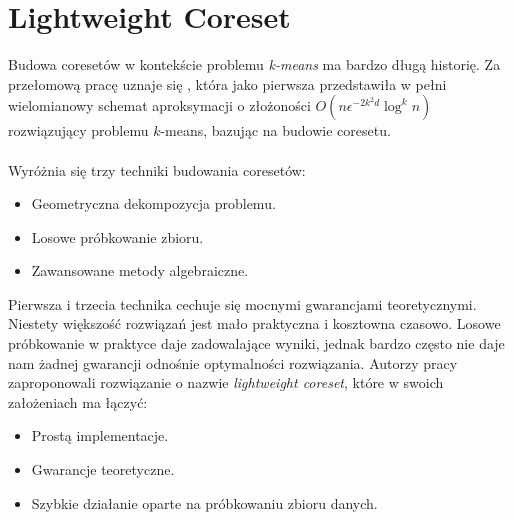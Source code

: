 \chapter{Lightweight Coreset}

Budowa coresetów w kontekście problemu \textit{k-means} ma bardzo długą historię.
Za przełomową pracę uznaje się \cite{Matousek99onapproximate}, która jako 
pierwsza przedstawiła w pełni wielomianowy schemat aproksymacji o złożoności $O(n\epsilon^{-2k^2d}\log^kn)$ rozwiązujący problemu $k$-means, bazując na budowie coresetu.
\\~\\
Wyróżnia się trzy techniki budowania coresetów:
\begin{itemize}
    \item Geometryczna dekompozycja problemu.
    \item Losowe próbkowanie zbioru.
    \item Zawansowane metody algebraiczne.
\end{itemize}
Pierwsza i trzecia technika cechuje się mocnymi gwarancjami teoretycznymi.
Niestety większość rozwiązań jest mało praktyczna i kosztowna czasowo.
Losowe próbkowanie w praktyce daje zadowalające wyniki, jednak bardzo często nie daje nam żadnej gwarancji odnośnie optymalności rozwiązania.
Autorzy pracy \cite{bachem2017scalable} zaproponowali rozwiązanie o nazwie \textit{lightweight coreset}, które w swoich założeniach ma łączyć:
\begin{itemize}
    \item Prostą implementacje.
    \item Gwarancje teoretyczne.
    \item Szybkie działanie oparte na próbkowaniu zbioru danych.
\end{itemize}


